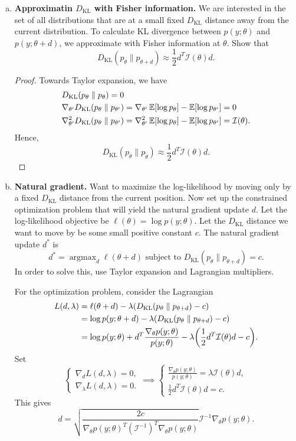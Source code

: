 \documentclass[12pt,letterpaper,boxed]{hmcpset}
\DeclareMathOperator*{\argmax}{argmax}
\newcommand{\DKL}[2]{D_{\mathrm{KL}}(#1 \parallel #2)}
\begin{document}
\begin{solution}
\begin{enumerate}[(a)]
  \item \textbf{Approximatin $D_{\mathrm{KL}}$ with Fisher information.} We are interested in the set of all distributions that are at a small fixed $D_{\mathrm{KL}}$ distance away from the current distribution. To calculate KL divergence between $p(y; \theta)$ and $p(y; \theta + d)$, we approximate with Fisher information at $\theta$. Show that
  \[
  \DKL{p_\theta}{p_{\theta + d}} \approx \frac{1}{2} d^T \mathcal{I}(\theta) d.
  \]
  \begin{proof}
    Towards Taylor expansion, we have
    \[
    \begin{aligned}
      & \DKL{p_\theta}{p_\theta} = 0 \\
      & \nabla_{\theta'} \DKL{p_\theta}{p_{\theta'}} = \nabla_{\theta'} \E[\log p_\theta] - \E[\log p_{\theta'}] = 0 \\ 
      &\nabla_{\theta'}^2 \DKL{p_\theta}{p_{\theta'}} = \nabla_{\theta'}^2 \E[\log p_\theta] - \E[\log p_{\theta'}] = \mathcal{I}(\theta).
    \end{aligned}
    \]
    Hence,
    \[
    \DKL{p_\theta}{p_{\tilde{\theta}}} \approx \frac{1}{2} d^T \mathcal{I}(\theta) d.
    \]
  \end{proof}

  \item \textbf{Natural gradient.} Want to maximize the log-likelihood by moving only by a fixed $D_{\mathrm{KL}}$ distance from the current position. Now set up the constrained optimization problem that will yield the natural gradient update $d$. Let the log-likelihood objective be $\ell(\theta) = \log p(y; \theta)$. Let the $D_{\mathrm{KL}}$ distance we want to move by be some small positive constant $c$. The natural gradient update $d^*$ is
  \[
  d^* = \argmax_d \ell(\theta + d) \text{ subject to } \DKL{p_\theta}{p_{\theta+d}} = c.
  \]
  In order to solve this, use Taylor expansion and Lagrangian multipliers.

  For the optimization problem, consider the Lagrangian
  \[
  \begin{aligned}
    L(d, \lambda) &= \ell(\theta + d) - \lambda \qty(\DKL{p_\theta}{p_{\theta+d}} - c) \\
    &= \log p(y; \theta + d) - \lambda \qty(\DKL{p_\theta}{p_{\theta+d}} - c) \\
    &= \log p(y; \theta) + d^T \frac{\nabla_{\theta} p(y;\theta)}{p(y; \theta)} - \lambda \qty(\frac{1}{2} d^T \mathcal{I}(\theta) d - c).
  \end{aligned}
  \]
  Set 
  \[
  \begin{cases}
    \nabla_d L(d, \lambda) = 0, \\
    \nabla_\lambda L(d, \lambda) = 0. 
  \end{cases}
  \implies
  \begin{cases}
    \frac{\nabla_{\theta} p(y;\theta)}{p(y; \theta)} = \lambda \mathcal{I}(\theta) d, \\
    \frac{1}{2} d^T \mathcal{I}(\theta) d = c.
  \end{cases}
  \]
  This gives
  \[
  d = \sqrt{\frac{2c}{\nabla_{\theta} p(y;\theta) ^T (\mathcal{I}^{-1})^T \nabla_{\theta} p(y;\theta)}} \mathcal{I}^{-1} \nabla_{\theta} p(y;\theta).
  \]
  

\end{enumerate}
\end{solution}
\end{document}
